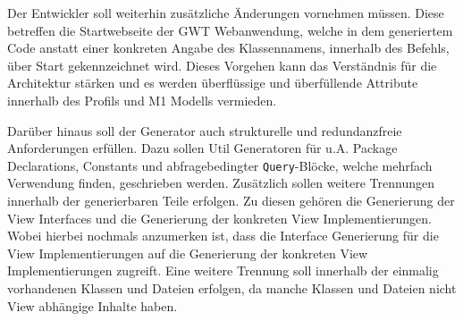 Der Entwickler soll weiterhin zusätzliche Änderungen vornehmen müssen. Diese
betreffen die Startwebseite der GWT Webanwendung, welche in dem generiertem
Code anstatt einer konkreten Angabe des Klassennamens, innerhalb des Befehls,
über \grqq{}Start\grqq{} gekennzeichnet wird. Dieses Vorgehen kann das Verständnis
für die Architektur stärken und es werden überflüssige und überfüllende
Attribute innerhalb des Profils und M1 Modells vermieden.

Darüber hinaus soll der Generator auch strukturelle und redundanzfreie
Anforderungen erfüllen. Dazu sollen Util Generatoren für u.A.
Package Declarations, Constants und abfragebedingter \texttt{Query}-Blöcke,
welche mehrfach Verwendung finden, geschrieben werden. Zusätzlich sollen weitere
Trennungen innerhalb der generierbaren Teile erfolgen. Zu diesen gehören die
Generierung der View Interfaces und die Generierung der konkreten View Implementierungen. Wobei
hierbei nochmals anzumerken ist, dass die Interface Generierung für die View
Implementierungen auf die Generierung der konkreten View Implementierungen
zugreift. Eine weitere Trennung soll innerhalb der einmalig vorhandenen Klassen
und Dateien erfolgen, da manche Klassen und Dateien nicht View abhängige Inhalte
haben.
